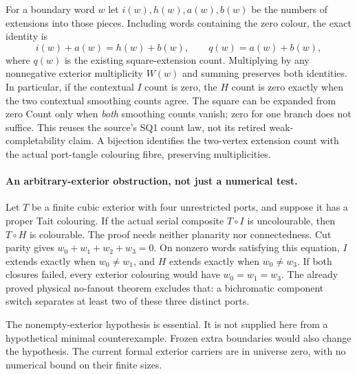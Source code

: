 For a boundary word $w$ let $i(w),h(w),a(w),b(w)$ be the numbers of
extensions into those pieces. Including words containing the zero colour,
the exact identity is
\[
 i(w)+a(w)=h(w)+b(w),
 \qquad q(w)=a(w)+b(w),
\]
where $q(w)$ is the existing square-extension count. Multiplying by any
nonnegative exterior multiplicity $W(w)$ and summing preserves both
identities. In particular, if the contextual $I$ count is zero, the $H$
count is zero exactly when the two contextual smoothing counts agree.
The square can be expanded from zero Count only when \emph{both} smoothing
counts vanish; zero for one branch does not suffice.
This reuses the source's SQ1 count law, not its retired weak-completability
claim. A bijection identifies the two-vertex extension count with the
actual port-tangle colouring fibre, preserving multiplicities.

\paragraph{An arbitrary-exterior obstruction, not just a numerical test.}
Let $T$ be a finite cubic exterior with four unrestricted ports, and suppose
it has a proper Tait colouring. If the actual serial composite $T\circ I$
is uncolourable, then $T\circ H$ is colourable.
The proof needs neither planarity nor connectedness. Cut parity gives
$w_0+w_1+w_2+w_3=0$. On nonzero words satisfying this equation, $I$ extends
exactly when $w_0\ne w_1$, and $H$ extends exactly when $w_0\ne w_3$.
If both closures failed, every exterior colouring would have
$w_0=w_1=w_3$. The already proved physical no-fanout theorem excludes
that: a bichromatic component switch separates at least two of these
three distinct ports.

The nonempty-exterior hypothesis is essential. It is not supplied here
from a hypothetical minimal counterexample. Frozen extra boundaries
would also change the hypothesis. The current formal exterior carriers
are in universe zero, with no numerical bound on their finite sizes.

